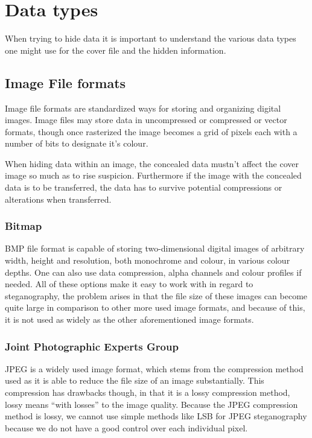 \section{Data types}
When trying to hide data it is important to understand the various data types one might use for the cover file and the hidden information.

\subsection{Image File formats}
Image file formats are standardized ways for storing and organizing digital images.
Image files may store data in uncompressed or compressed or vector formats, though once rasterized the image becomes a grid of pixels each with a number of bits to designate it's colour.


When hiding data within an image, the concealed data mustn't affect the cover image so much as to rise suspicion.
Furthermore if the image with the concealed data is to be transferred, the data has to survive potential compressions or alterations when transferred.

\subsubsection*{Bitmap}
BMP file format is capable of storing two-dimensional digital images of arbitrary width, height and resolution, both monochrome and colour, in various colour depths. 
One can also use data compression, alpha channels and colour profiles if needed.
All of these options make it easy to work with in regard to steganography, the problem arises in that the file size of these images can become quite large in comparison to other more used image formats, and because of this, it is not used as widely as the other aforementioned image formats.

\subsubsection*{Joint Photographic Experts Group}
JPEG is a widely used image format, which stems from the compression method used as it is able to reduce the file size of an image substantially.
This compression has drawbacks though, in that it is a lossy compression method, lossy means ``with losses'' to the image quality.
Because the JPEG compression method is lossy, we cannot use simple methods like LSB for JPEG steganography because we do not have a good control over each individual pixel.


